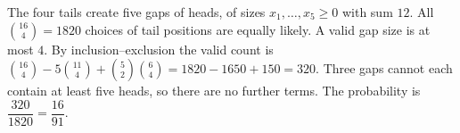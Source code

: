 The four tails create five gaps of heads, of sizes $x_1,\ldots,x_5\ge0$ with sum $12$. All $\binom{16}{4}=1820$ choices of tail positions are equally likely. A valid gap size is at most $4$. By inclusion--exclusion the valid count is $\binom{16}{4}-5\binom{11}{4}+\binom52\binom64=1820-1650+150=320$. Three gaps cannot each contain at least five heads, so there are no further terms. The probability is $\dfrac{320}{1820}=\boxed{\dfrac{16}{91}}$.
